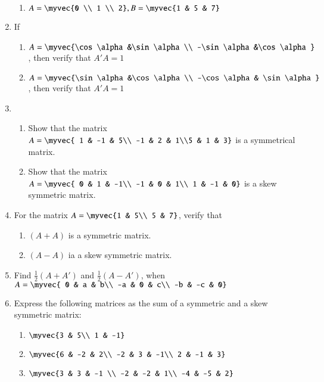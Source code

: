 \documentclass{article}
\theoremstyle{remark}
\begin{document}
\begin{enumerate}
\begin{enumerate}[label=(\roman*)]
\item $A=\myvec {0  \\ 1 \\ 2} , B=\myvec {1 & 5 & 7}$
\end{enumerate}
\item If 
\begin{enumerate}[label=(\roman*)]
\item $A=\myvec {\cos \alpha &\sin \alpha \\ -\sin \alpha &\cos \alpha }$,
then verify that $A'A=1$
\item $A=\myvec{\sin \alpha &\cos \alpha \\ -\cos  \alpha & \sin \alpha}$
, then verify that $A'A=1$
\end{enumerate}
\item
\begin{enumerate}[label=(\roman*)]
\item Show that the matrix $A=\myvec{ 1 & -1 & 5\\ -1 & 2 & 1\\5 & 1 & 3} $ is a symmetrical matrix.
\item Show that the matrix $A=\myvec{ 0 &  1 & -1\\ -1 & 0 & 1\\ 1 & -1 & 0} $ is a skew symmetric matrix.
\end{enumerate} 
\item For the matrix $A=\myvec {1 & 5\\ 5 & 7}$, verify that
\begin{enumerate}[label=(\roman*)]
\item $(A+A)$ is a symmetric matrix.
\item $(A-A)$ ia a skew symmetric matrix.
\end{enumerate}
\item Find $\frac{1}{2} (A+A')$ and $\frac{1}{2} (A-A')$,
when $A=\myvec{ 0 & a & b\\ -a & 0 & c\\ -b & -c & 0}$
\item Express the following matrices as the sum of a symmetric and a skew symmetric matrix:
\begin{enumerate}[label=(\roman*)]
\item $\myvec{3 & 5\\ 1 & -1}$
\item $\myvec{6 & -2 & 2\\ -2 & 3 & -1\\ 2 & -1 & 3}$
\item $\myvec{3 & 3 & -1 \\ -2 & -2 & 1\\ -4 & -5 & 2}$

\end{enumerate}
\end{enumerate}
\end{document}
